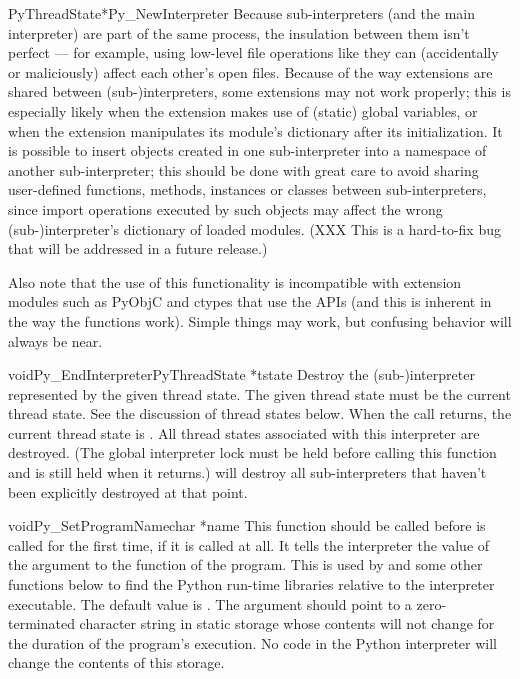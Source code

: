 \begin{cfuncdesc}{PyThreadState*}{Py_NewInterpreter}{}
   Because sub-interpreters (and the main
  interpreter) are part of the same process, the insulation between
  them isn't perfect --- for example, using low-level file operations
  like 
   they can (accidentally or maliciously) affect
  each other's open files.  Because of the way extensions are shared
  between (sub-)interpreters, some extensions may not work properly;
  this is especially likely when the extension makes use of (static)
  global variables, or when the extension manipulates its module's
  dictionary after its initialization.  It is possible to insert
  objects created in one sub-interpreter into a namespace of another
  sub-interpreter; this should be done with great care to avoid
  sharing user-defined functions, methods, instances or classes
  between sub-interpreters, since import operations executed by such
  objects may affect the wrong (sub-)interpreter's dictionary of
  loaded modules.  (XXX This is a hard-to-fix bug that will be
  addressed in a future release.)

  Also note that the use of this functionality is incompatible with
  extension modules such as PyObjC and ctypes that use the
   APIs (and this is inherent in the way the
   functions work).  Simple things may work,
  but confusing behavior will always be near.
\end{cfuncdesc}

\begin{cfuncdesc}{void}{Py_EndInterpreter}{PyThreadState *tstate}
  Destroy the (sub-)interpreter represented by the given thread state.
  The given thread state must be the current thread state.  See the
  discussion of thread states below.  When the call returns, the
  current thread state is \NULL.  All thread states associated with
  this interpreter are destroyed.  (The global interpreter lock must
  be held before calling this function and is still held when it
  returns.)   will
  destroy all sub-interpreters that haven't been explicitly destroyed
  at that point.
\end{cfuncdesc}

\begin{cfuncdesc}{void}{Py_SetProgramName}{char *name}
  This function should be called before
   is called
  for the first time, if it is called at all.  It tells the
  interpreter the value of the  argument to the
   function of the program.  This is
  used by  and some
  other functions below to find the Python run-time libraries relative
  to the interpreter executable.  The default value is
  .  The argument should point to a zero-terminated
  character string in static storage whose contents will not change
  for the duration of the program's execution.  No code in the Python
  interpreter will change the contents of this storage.
\end{cfuncdesc}

